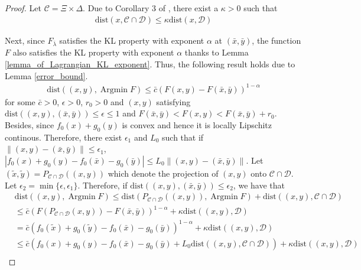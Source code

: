 \documentclass{article}
\numberwithin{equation}{section}
\def\Argmin{\mathop{\mathrm{Argmin}}}
\begin{document}
    \begin{proof}
        Let $\mathcal{C} = \Xi \times \Delta$. Due to Corollary 3 of \cite{bauschke1999strong}, there exist a $\kappa>0$ such that
        \begin{align} 
            \mathrm{dist}(x,\mathcal{C}\cap \mathcal{D}) \leq \kappa \mathrm{dist}(x,\mathcal{D}) 
            \label{corollary_bauschke}
        \end{align}
    
        Next, since $F_{\bar{\lambda}}$ satisfies the KL property with exponent $\alpha$ at $(\bar{x},\bar{y})$, the 
        function $F$ also satisfies the KL property with exponent $\alpha$ thanks to Lemma \ref{lemma_of_Lagrangian_KL_exponent}. Thus, the following
        result holds due to Lemma \ref{error_bound}.
        \begin{align}
            \mathrm{dist} ((x,y),\Argmin F) \leq \bar{c}(F(x,y) - F(\bar{x},\bar{y}))^{1-\alpha} \label{property_of_error_bound}
        \end{align}
        for some $\bar{c} >0$, $\epsilon>0$, $r_0>0$ and $(x,y)$ satisfying $\mathrm{dist}((x,y),(\bar{x},\bar{y})) \leq \epsilon\leq 1$ and 
        $F(\bar{x},\bar{y})<F(x,y)<F(\bar{x},\bar{y}) + r_0$.
        Besides, since $f_0(x)+ g_0(y)$ is convex and hence it is locally Lipschitz continous. 
        Therefore, there exist $\epsilon_1$ and $L_0$ such that if $\|(x,y) - (\bar{x},\bar{y})\rVert \leq \epsilon_1$, 
        $|f_0(x)+g_0(y) - f_0(\bar{x}) -g_0(\bar{y})| \leq L_0\|(x,y) - (\bar{x},\bar{y})\rVert $. 
        Let $(\tilde{x},\tilde{y})= P_{\mathcal{C}\cap \mathcal{D}}((x,y))$ which denote the projection of $(x,y)$ onto $\mathcal{C}\cap \mathcal{D}$.
        Let $\epsilon_2 = \min\{\epsilon, \epsilon_1\}$. Therefore, if $\mathrm{dist}((x,y),(\bar{x},\bar{y}))\leq \epsilon_2$, we have that 
        \begin{align}
            &\mathrm{dist}((x,y), \Argmin F) \leq \mathrm{dist}(P_{\mathcal{C}\cap\mathcal{D}}((x,y)), \Argmin F)
            + \mathrm{dist}((x,y),\mathcal{C}\cap\mathcal{D}) \nonumber \\
            & \overset{\mathop{(a)}}{\leq} \bar{c}(F(P_{\mathcal{C}\cap \mathcal{D}}(x,y)) - F(\bar{x},\bar{y}))^{1-\alpha} + \kappa\mathrm{dist}((x,y),\mathcal{D}) \nonumber \\
            & =\bar{c}(f_0(\tilde{x})+g_0(\tilde{y})-f_0(\bar{x})-g_0(\bar{y}))^{1-\alpha} + \kappa\mathrm{dist}((x,y),\mathcal{D})  \nonumber \\
            & \overset{\mathop{(b)}}{\leq} \bar{c}(f_0(x)+g_0(y)-f_0(\bar{x})-g_0(\bar{y})+L_0\mathrm{dist}((x,y), \mathcal{C}\cap\mathcal{D})) +\kappa \mathrm{dist}((x,y),\mathcal{D}) \nonumber \\

\end{align}
\end{proof}
\end{document}
